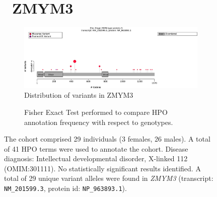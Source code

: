 \begin{figure}[htbp]
\section*{ ZMYM3}
\centering
\begin{subfigure}[b]{0.95\textwidth}
\centering
\includegraphics[width=\textwidth]{ img/ZMYM3_protein_diagram.pdf} 
\captionsetup{justification=raggedright,singlelinecheck=false}
\caption{Distribution of variants in ZMYM3}
\end{subfigure}

\vspace{2em}

\begin{subfigure}[b]{0.95\textwidth}
\centering
{}
\captionsetup{justification=raggedright,singlelinecheck=false}
\caption{Fisher Exact Test performed to compare HPO annotation frequency with respect to genotypes.}
\end{subfigure}

\vspace{2em}

\caption{The cohort comprised 29 individuals (3 females, 26 males). A total of 41 HPO terms were used to annotate the cohort. Disease diagnosis: Intellectual developmental disorder, X-linked 112 (OMIM:301111). No statistically significant results identified. A total of 29 unique variant alleles were found in \textit{ZMYM3} (transcript: \texttt{NM\_201599.3}, protein id: \texttt{NP\_963893.1}).}
\end{figure}
